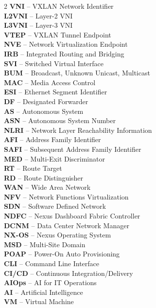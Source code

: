 \begin{multicols}{2}
\textbf{VNI} -- VXLAN Network Identifier\\
\textbf{L2VNI} -- Layer-2 VNI\\
\textbf{L3VNI} -- Layer-3 VNI\\
\textbf{VTEP} -- VXLAN Tunnel Endpoint\\
\textbf{NVE} -- Network Virtualization Endpoint\\
\textbf{IRB} -- Integrated Routing and Bridging\\
\textbf{SVI} -- Switched Virtual Interface\\
\textbf{BUM} -- Broadcast, Unknown Unicast, Multicast\\
\textbf{MAC} -- Media Access Control\\
\textbf{ESI} -- Ethernet Segment Identifier\\
\textbf{DF} -- Designated Forwarder\\
\textbf{AS} -- Autonomous System\\
\textbf{ASN} -- Autonomous System Number\\
\textbf{NLRI} -- Network Layer Reachability Information\\
\textbf{AFI} -- Address Family Identifier\\
\textbf{SAFI} -- Subsequent Address Family Identifier\\
\textbf{MED} -- Multi-Exit Discriminator\\
\textbf{RT} -- Route Target\\
\textbf{RD} -- Route Distinguisher\\
\textbf{WAN} -- Wide Area Network\\
\textbf{NFV} -- Network Functions Virtualization\\
\textbf{SDN} -- Software Defined Network\\
\textbf{NDFC} -- Nexus Dashboard Fabric Controller\\
\textbf{DCNM} -- Data Center Network Manager\\
\textbf{NX-OS} -- Nexus Operating System\\
\textbf{MSD} -- Multi-Site Domain\\
\textbf{POAP} -- Power-On Auto Provisioning\\
\textbf{CLI} -- Command Line Interface\\
\textbf{CI/CD} -- Continuous Integration/Delivery\\
\textbf{AIOps} -- AI for IT Operations\\
\textbf{AI} -- Artificial Intelligence\\
\textbf{VM} -- Virtual Machine\\

\end{multicols}
